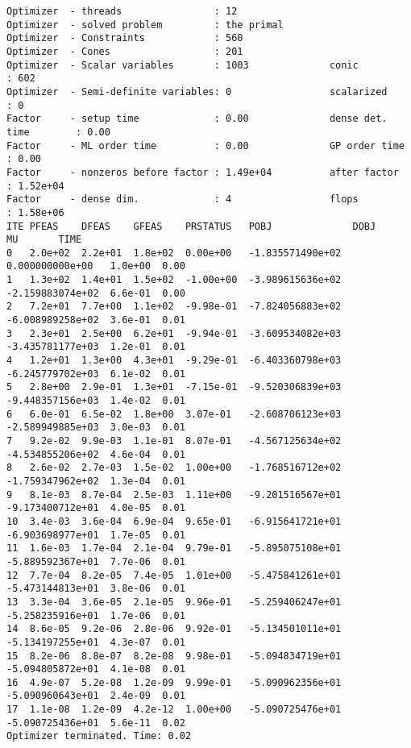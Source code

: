 \documentclass[
  10pt,
  a4paper,
,tablecaptionabove
]{scrartcl}
\begin{document}
\begin{verbatim}
Optimizer  - threads                : 12              
Optimizer  - solved problem         : the primal      
Optimizer  - Constraints            : 560
Optimizer  - Cones                  : 201
Optimizer  - Scalar variables       : 1003              conic                  : 602             
Optimizer  - Semi-definite variables: 0                 scalarized             : 0               
Factor     - setup time             : 0.00              dense det. time        : 0.00            
Factor     - ML order time          : 0.00              GP order time          : 0.00            
Factor     - nonzeros before factor : 1.49e+04          after factor           : 1.52e+04        
Factor     - dense dim.             : 4                 flops                  : 1.58e+06        
ITE PFEAS    DFEAS    GFEAS    PRSTATUS   POBJ              DOBJ              MU       TIME  
0   2.0e+02  2.2e+01  1.8e+02  0.00e+00   -1.835571490e+02  0.000000000e+00   1.0e+00  0.00  
1   1.3e+02  1.4e+01  1.5e+02  -1.00e+00  -3.989615636e+02  -2.159883074e+02  6.6e-01  0.00  
2   7.2e+01  7.7e+00  1.1e+02  -9.98e-01  -7.824056883e+02  -6.008989258e+02  3.6e-01  0.01  
3   2.3e+01  2.5e+00  6.2e+01  -9.94e-01  -3.609534082e+03  -3.435781177e+03  1.2e-01  0.01  
4   1.2e+01  1.3e+00  4.3e+01  -9.29e-01  -6.403360798e+03  -6.245779702e+03  6.1e-02  0.01  
5   2.8e+00  2.9e-01  1.3e+01  -7.15e-01  -9.520306839e+03  -9.448357156e+03  1.4e-02  0.01  
6   6.0e-01  6.5e-02  1.8e+00  3.07e-01   -2.608706123e+03  -2.589949885e+03  3.0e-03  0.01  
7   9.2e-02  9.9e-03  1.1e-01  8.07e-01   -4.567125634e+02  -4.534855206e+02  4.6e-04  0.01  
8   2.6e-02  2.7e-03  1.5e-02  1.00e+00   -1.768516712e+02  -1.759347962e+02  1.3e-04  0.01  
9   8.1e-03  8.7e-04  2.5e-03  1.11e+00   -9.201516567e+01  -9.173400712e+01  4.0e-05  0.01  
10  3.4e-03  3.6e-04  6.9e-04  9.65e-01   -6.915641721e+01  -6.903698977e+01  1.7e-05  0.01  
11  1.6e-03  1.7e-04  2.1e-04  9.79e-01   -5.895075108e+01  -5.889592367e+01  7.7e-06  0.01  
12  7.7e-04  8.2e-05  7.4e-05  1.01e+00   -5.475841261e+01  -5.473144813e+01  3.8e-06  0.01  
13  3.3e-04  3.6e-05  2.1e-05  9.96e-01   -5.259406247e+01  -5.258235916e+01  1.7e-06  0.01  
14  8.6e-05  9.2e-06  2.8e-06  9.92e-01   -5.134501011e+01  -5.134197255e+01  4.3e-07  0.01  
15  8.2e-06  8.8e-07  8.2e-08  9.98e-01   -5.094834719e+01  -5.094805872e+01  4.1e-08  0.01  
16  4.9e-07  5.2e-08  1.2e-09  9.99e-01   -5.090962356e+01  -5.090960643e+01  2.4e-09  0.01  
17  1.1e-08  1.2e-09  4.2e-12  1.00e+00   -5.090725476e+01  -5.090725436e+01  5.6e-11  0.02  
Optimizer terminated. Time: 0.02    


\end{verbatim}
\end{document}
